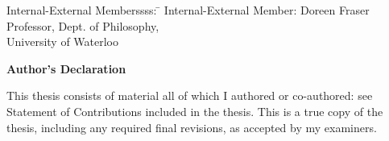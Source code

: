 \documentclass[letterpaper,12pt,titlepage,oneside,final]{book}
\let\origdoublepage\cleardoublepage
\newcommand{\clearemptydoublepage}{%
  \clearpage{\pagestyle{empty}\origdoublepage}}
\let\cleardoublepage\clearemptydoublepage
\begin{document}
  \noindent
\begin{tabbing}
Internal-External Memberssss: \=  \kill %
Internal-External Member: \> Doreen Fraser \\
\> Professor, Dept. of Philosophy, \\ \>University of Waterloo \\
\end{tabbing}
  \bigskip
  

\cleardoublepage
{}    %











 \begin{center}\textbf{Author's Declaration}\end{center}

 \noindent
This thesis consists of material all of which I authored or co-authored: see Statement of Contributions included in the thesis. This is a true copy of the thesis, including any required final revisions, as accepted by my examiners.
 
 \noindent  
  \bigskip
  
\end{document}
